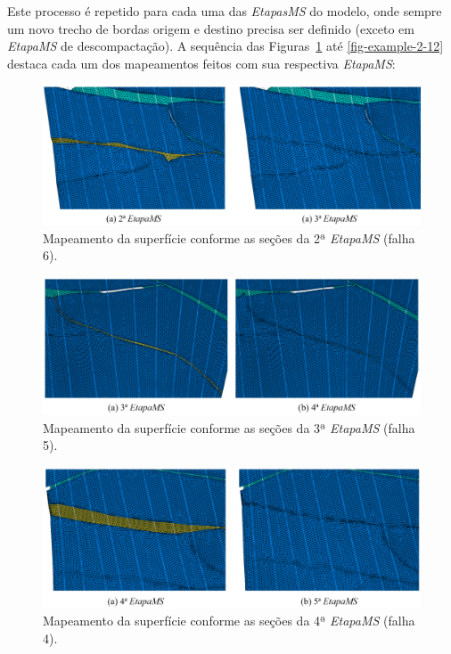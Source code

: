 Este processo é repetido para cada uma das \textit{EtapasMS} do modelo, onde sempre um novo trecho de bordas origem e destino precisa ser definido (exceto em \textit{EtapaMS} de descompactação). A sequência das Figuras~\ref{fig-example-2-9} até \ref{fig-example-2-12} destaca cada um dos mapeamentos feitos com sua respectiva \textit{EtapaMS}:

\begin{figure} [H]
  \begin{center}
    \includegraphics[width=\textwidth]{images/fig-example-2-9}
    \caption{Mapeamento da superfície conforme as seções da 2ª \textit{EtapaMS} (falha 6).}\label{fig-example-2-9}
  \end{center}
\end{figure}

\begin{figure} [H]
  \begin{center}
    \includegraphics[width=\textwidth]{images/fig-example-2-10}
    \caption{Mapeamento da superfície conforme as seções da 3ª \textit{EtapaMS} (falha 5).}\label{fig-example-2-10}
  \end{center}
\end{figure}

\begin{figure} [H]
  \begin{center}
    \includegraphics[width=\textwidth]{images/fig-example-2-11}
    \caption{Mapeamento da superfície conforme as seções da 4ª \textit{EtapaMS} (falha 4).}\label{fig-example-2-11}
  \end{center}
\end{figure}

